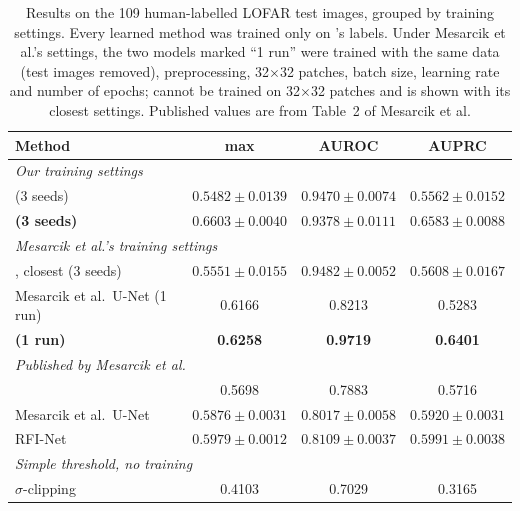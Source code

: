\begin{table}[H]
  \centering
  \caption[Comparison with published methods on LOFAR]{Results on the 109 human-labelled LOFAR test images, grouped
    by training settings. Every learned method was trained only on \aoflagger{}'s
    labels. Under Mesarcik et al.'s settings, the two models marked ``1 run''
    were trained with the same data (test images removed), preprocessing,
    32$\times$32 patches, batch size, learning rate and number of epochs;
    \tfunet{} cannot be trained on 32$\times$32 patches and is shown with its
    closest settings. Published values are from Table~2 of Mesarcik et al.}
  \label{tab:final}
  \footnotesize
  \setlength{\tabcolsep}{4pt}
  \begin{tabular}{lccc}
    \toprule
    Method & max \Fone{} & AUROC & AUPRC \\
    \midrule
    \multicolumn{4}{l}{\textit{Our training settings}} \\
    \tfunet{} (3 seeds) & $0.5482 \pm 0.0139$ & $0.9470 \pm 0.0074$ & $0.5562 \pm 0.0152$ \\
    \textbf{\hybrid{} (3 seeds)} & $\mathbf{0.6603 \pm 0.0040}$ & $0.9378 \pm 0.0111$ & $\mathbf{0.6583 \pm 0.0088}$ \\
    \midrule
    \multicolumn{4}{l}{\textit{Mesarcik et al.'s training settings}} \\
    \tfunet{}, closest (3 seeds) & $0.5551 \pm 0.0155$ & $0.9482 \pm 0.0052$ & $0.5608 \pm 0.0167$ \\
    Mesarcik et al.\ U-Net (1 run) & 0.6166 & 0.8213 & 0.5283 \\
    \textbf{\hybrid{} (1 run)} & \textbf{0.6258} & \textbf{0.9719} & \textbf{0.6401} \\
    \midrule
    \multicolumn{4}{l}{\textit{Published by Mesarcik et al.}} \\
    \aoflagger{} & 0.5698 & 0.7883 & 0.5716 \\
    Mesarcik et al.\ U-Net & $0.5876 \pm 0.0031$ & $0.8017 \pm 0.0058$ & $0.5920 \pm 0.0031$ \\
    RFI-Net & $\mathbf{0.5979 \pm 0.0012}$ & $\mathbf{0.8109 \pm 0.0037}$ & $\mathbf{0.5991 \pm 0.0038}$ \\
    \midrule
    \multicolumn{4}{l}{\textit{Simple threshold, no training}} \\
    $\sigma$-clipping & 0.4103 & 0.7029 & 0.3165 \\
    \bottomrule
  \end{tabular}
\end{table}

